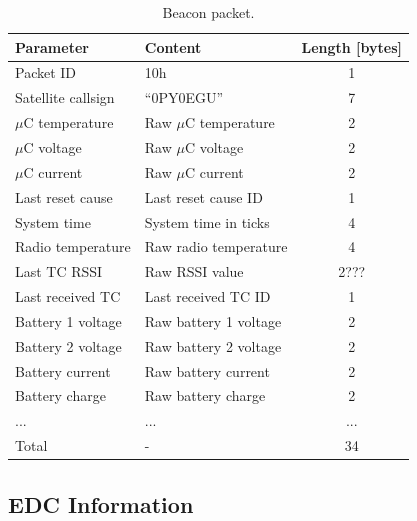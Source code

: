 \begin{table}[!h]
    \centering
    \begin{tabular}{llc}
        \toprule[1.5pt]
        \textbf{Parameter} & \textbf{Content}       & \textbf{Length [bytes]} \\
        \midrule
        Packet ID          & 10h                    & 1 \\
        Satellite callsign & ``0PY0EGU''            & 7 \\
        $\mu$C temperature & Raw $\mu$C temperature & 2 \\
        $\mu$C voltage     & Raw $\mu$C voltage     & 2 \\
        $\mu$C current     & Raw $\mu$C current     & 2 \\
        Last reset cause   & Last reset cause ID    & 1 \\
        System time        & System time in ticks   & 4 \\
        Radio temperature  & Raw radio temperature  & 4 \\
        Last TC RSSI       & Raw RSSI value         & 2??? \\
        Last received TC   & Last received TC ID    & 1 \\
        Battery 1 voltage  & Raw battery 1 voltage  & 2 \\
        Battery 2 voltage  & Raw battery 2 voltage  & 2 \\
        Battery current    & Raw battery current    & 2 \\
        Battery charge     & Raw battery charge     & 2 \\
        ...                & ...                    & ... \\
        \midrule
        Total              & -                      & 34 \\
        \bottomrule[1.5pt]
    \end{tabular}
    \caption{Beacon packet.}
    \label{tab:telemetry-beacon}
\end{table}

\subsection{EDC Information}

